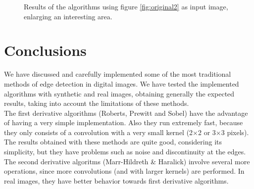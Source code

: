 \documentclass{ipol}
\numberwithin{equation}{section}
\numberwithin{table}{section}
\numberwithin{figure}{section}
\begin{document}
\begin{figure}[h!]
	\quad
	\caption{Results of the algorithms using figure \ref{fig:original2} as input image, enlarging an interesting area.}
	\label{fig:result3}
\end{figure}

\clearpage
\section{Conclusions}
\label{sec:conclusions}

We have discussed and carefully implemented some of the most traditional methods of edge detection in digital images. We have tested the implemented algorithms with synthetic and real images, obtaining generally the expected results, taking into account the limitations of these methods. \\

The first derivative algorithms (Roberts, Prewitt and Sobel) have the advantage of having a very simple implementation. Also they run extremely fast, because they only consists of a convolution with a very small kernel (2$\times$2 or 3$\times$3 pixels). The results obtained with these methods are quite good, considering its simplicity, but they have problems such as noise and discontinuity at the edges. \\

The second derivative algoritms (Marr-Hildreth \& Haralick) involve several more operations, since more convolutions (and with larger kernels) are performed. In real images, they have better behavior towards first derivative algorithms. \\
\end{document}
